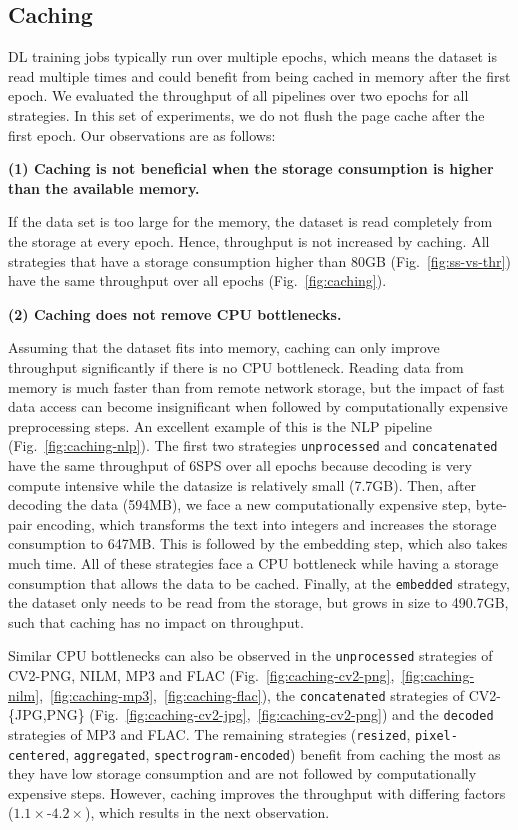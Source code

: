 {\color{diff}
\vspace{-0.3cm}
\subsection{Caching}
\label{ssec:caching}

DL training jobs typically run over multiple epochs, which means the dataset is read multiple times and could benefit from being cached in memory after the first epoch.
We evaluated the throughput of all pipelines over two epochs for all strategies.
In this set of experiments, we do not flush the page cache after the first epoch.
Our observations are as follows:

\textbf{(1) Caching is not beneficial when the storage consumption is higher than the available memory.}

If the data set is too large for the memory, the dataset is read completely from the storage at every epoch.
Hence, throughput is not increased by caching.
All strategies that have a storage consumption higher than 80\:GB (Fig.~\ref{fig:ss-vs-thr}) have the same throughput over all epochs (Fig.~\ref{fig:caching}).

\textbf{(2) Caching does not remove CPU bottlenecks. }

Assuming that the dataset fits into memory, caching can only improve throughput significantly if there is no CPU bottleneck.
Reading data from memory is much faster than from remote network storage, but the impact of fast data access can become insignificant when followed by computationally expensive preprocessing steps.
An excellent example of this is the NLP pipeline (Fig.~\ref{fig:caching-nlp}).
The first two strategies \texttt{unprocessed} and \texttt{concatenated} have the same throughput of 6\:SPS over all epochs because decoding is very compute intensive while the datasize is relatively small (7.7\:GB).
Then, after decoding the data (594\:MB), we face a new computationally expensive step, byte-pair encoding, which transforms the text into integers and increases the storage consumption to 647\:MB.
This is followed by the embedding step, which also takes much time.
All of these strategies face a CPU bottleneck while having a storage consumption that allows the data to be cached.
Finally, at the \texttt{embedded} strategy, the dataset only needs to be read from the storage, but grows in size to 490.7\:GB, such that caching has no impact on throughput.

Similar CPU bottlenecks can also be observed in the \texttt{unprocessed} strategies of CV2-PNG, NILM, MP3 and FLAC (Fig.~\ref{fig:caching-cv2-png},~\ref{fig:caching-nilm},~\ref{fig:caching-mp3},~\ref{fig:caching-flac}), the \texttt{concatenated} strategies of CV2-\{JPG,PNG\} (Fig.~\ref{fig:caching-cv2-jpg},~\ref{fig:caching-cv2-png}) and the \texttt{decoded} strategies of MP3 and FLAC.
The remaining strategies (\texttt{resized}, \texttt{pixel-centered}, \texttt{aggregated}, \texttt{spectrogram-encoded}) benefit from caching the most as they have low storage consumption and are not followed by computationally expensive steps.
However, caching improves the throughput with differing factors ($1.1\times$-$4.2\times$), which results in the next observation.

}
